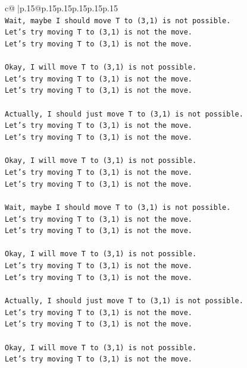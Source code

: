 \documentclass{article}
\begin{document}
{\begin{supertabular}{c@{$\;$}|p{.15\linewidth}@{}p{.15\linewidth}p{.15\linewidth}p{.15\linewidth}p{.15\linewidth}p{.15\linewidth}}
{{{\\ 
\texttt{Wait, maybe I should move T to (3,1) is not possible.} \\
\texttt{Let's try moving T to (3,1) is not the move.} \\
\texttt{Let's try moving T to (3,1) is not the move.} \\
\\ 
\texttt{Okay, I will move T to (3,1) is not possible.} \\
\texttt{Let's try moving T to (3,1) is not the move.} \\
\texttt{Let's try moving T to (3,1) is not the move.} \\
\\ 
\texttt{Actually, I should just move T to (3,1) is not possible.} \\
\texttt{Let's try moving T to (3,1) is not the move.} \\
\texttt{Let's try moving T to (3,1) is not the move.} \\
\\ 
\texttt{Okay, I will move T to (3,1) is not possible.} \\
\texttt{Let's try moving T to (3,1) is not the move.} \\
\texttt{Let's try moving T to (3,1) is not the move.} \\
\\ 
\texttt{Wait, maybe I should move T to (3,1) is not possible.} \\
\texttt{Let's try moving T to (3,1) is not the move.} \\
\texttt{Let's try moving T to (3,1) is not the move.} \\
\\ 
\texttt{Okay, I will move T to (3,1) is not possible.} \\
\texttt{Let's try moving T to (3,1) is not the move.} \\
\texttt{Let's try moving T to (3,1) is not the move.} \\
\\ 
\texttt{Actually, I should just move T to (3,1) is not possible.} \\
\texttt{Let's try moving T to (3,1) is not the move.} \\
\texttt{Let's try moving T to (3,1) is not the move.} \\
\\ 
\texttt{Okay, I will move T to (3,1) is not possible.} \\
\texttt{Let's try moving T to (3,1) is not the move.} \\
}}}
\end{supertabular}}
\end{document}
